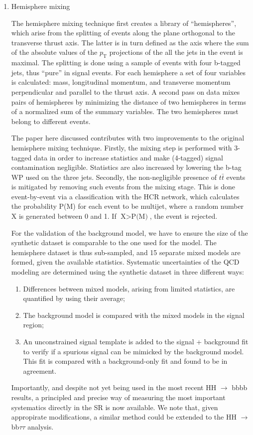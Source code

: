 \documentclass[11pt]{article}
\newcommand{\bbbb}{HH $\rightarrow$ bbbb}
\newcommand{\bbtt}{HH $\rightarrow$ bb$\tau\tau$}
\newcommand{\pt}{p_{\text{T}}}
\newcommand{\ttbar}{t\bar{t}}
\begin{document}
\begin{enumerate}
\item Hemisphere mixing
\label{sec:org54b944e}
\label{sec:hemisphere_mixing}

The hemisphere mixing technique \cite{hemisphere_mixing} first creates a library of ``hemispheres'', which arise from the splitting of events along the plane orthogonal to the transverse thrust axis.
The latter is in turn defined as the axis where the sum of the absolute values of the \(\pt\) projections of the all the jets in the event is maximal.
The splitting is done using a sample of events with four b-tagged jets, thus ``pure'' in signal events.
For each hemisphere a set of four variables is calculated: mass, longitudinal momentum, and transverse momentum perpendicular and parallel to the thrust axis.
A second pass on data mixes pairs of hemispheres by minimizing the distance of two hemispheres in terms of a normalized sum of the summary variables.
The two hemispheres must belong to different events.

The paper here discussed \cite{zz_zh_bbbb} contributes with two improvements to the original hemisphere mixing technique.
Firstly, the mixing step is performed with 3-tagged data in order to increase statistics and make (4-tagged) signal contamination negligible.
Statistics are also increased by lowering the b-tag \ac{WP} used on the three jets.
Secondly, the non-negligible presence of \(\ttbar{}\) events is mitigated by removing such events from the mixing stage.
This is done event-by-event via a classification with the \ac{HCR} network, which calculates the probability P(M) for each event to be multijet, where a random number X is generated between 0 and 1. If \(\text{X} > \text{P(M)}\), the event is rejected.

For the validation of the background model, we have to ensure the size of the synthetic dataset is comparable to the one used for the model.
The hemisphere dataset is thus sub-sampled, and 15 separate mixed models are formed, given the available statistics.
Systematic uncertainties of the \ac{QCD} modeling are determined using the synthetic dataset in three different ways:
\begin{enumerate}
\item Differences between mixed models, arising from limited statistics, are quantified by using their average;
\item The background model is compared with the mixed models in the signal region;
\item An unconstrained signal template is added to the signal + background fit to verify if a spurious signal can be mimicked by the background model. This fit is compared with a background-only fit and found to be in agreement.
\end{enumerate}

Importantly, and despite not yet being used in the most recent \bbbb{} results, a principled and precise way of measuring the most important systematics directly in the \ac{SR} is now available.
We note that, given appropirate modifications, a similar method could be extended to the \bbtt{} analysis.
\end{enumerate}
\end{document}
